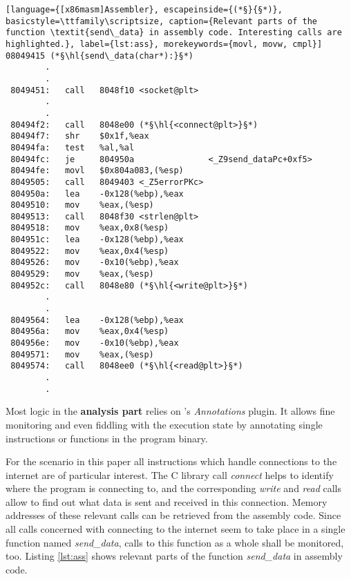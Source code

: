 \bigskip
\begin{lstlisting}[language={[x86masm]Assembler}, escapeinside={(*§}{§*)}, basicstyle=\ttfamily\scriptsize, caption={Relevant parts of the function \textit{send\_data} in assembly code. Interesting calls are highlighted.}, label={lst:ass}, morekeywords={movl, movw, cmpl}]
08049415 (*§\hl{send\_data(char*):}§*)
		.
		.
 8049451:   call   8048f10 <socket@plt>
		.
		.
 80494f2:   call   8048e00 (*§\hl{<connect@plt>}§*)
 80494f7:   shr    $0x1f,%eax
 80494fa:   test   %al,%al
 80494fc:   je     804950a				 <_Z9send_dataPc+0xf5>
 80494fe:   movl   $0x804a083,(%esp)
 8049505:   call   8049403 <_Z5errorPKc>
 804950a:   lea    -0x128(%ebp),%eax
 8049510:   mov    %eax,(%esp)
 8049513:   call   8048f30 <strlen@plt>
 8049518:   mov    %eax,0x8(%esp)
 804951c:   lea    -0x128(%ebp),%eax
 8049522:   mov    %eax,0x4(%esp)
 8049526:   mov    -0x10(%ebp),%eax
 8049529:   mov    %eax,(%esp)
 804952c:   call   8048e80 (*§\hl{<write@plt>}§*)
 	 	.
 	 	.
 8049564:   lea    -0x128(%ebp),%eax
 804956a:   mov    %eax,0x4(%esp)
 804956e:   mov    -0x10(%ebp),%eax
 8049571:   mov    %eax,(%esp)
 8049574:   call   8048ee0 (*§\hl{<read@plt>}§*)
		.
		.
\end{lstlisting}
\bigskip

Most logic in the \textbf{analysis part} relies on \sse's \textit{Annotations} plugin.
It allows fine monitoring and even fiddling with the execution state by annotating single instructions or functions in the program binary.

For the scenario in this paper all instructions which handle connections to the internet are of particular interest.
The C library call \textit{connect} helps to identify where the program is connecting to, and the corresponding \textit{write} and \textit{read} calls allow to find out what data is sent and received in this connection.
Memory addresses of these relevant calls can be retrieved from the assembly code.
Since all calls concerned with connecting to the internet seem to take place in a single function named \textit{send\_data}, calls to this function as a whole shall be monitored, too.
Listing \ref{lst:ass} shows relevant parts of the function \textit{send\_data} in assembly code.


